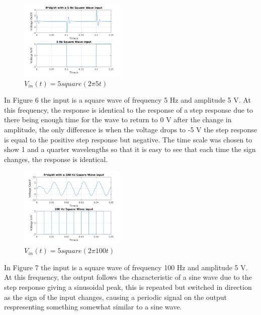 \documentclass[11pt,a4paper]{article}
\begin{document}
\begin{figure}
    \vspace{-40mm}
  		\includegraphics[width=0.45\textwidth]{Ex3_Figs/5Squ1.png}
	\vspace{-6mm}
  	\caption{$V_{in}(t)= 5square(2 \pi 5t)$}
  	\label{fig:ex3g5}
\end{figure}

\vspace{3mm}In Figure 6 the input is a square wave of frequency 5 Hz and amplitude 5 V. At this frequency, the response is identical to the response of a step response due to there being enough time for the wave to return to 0 V after the change in amplitude, the only difference is when the voltage drops to -5 V the step response is equal to the positive step response but negative. The time scale was chosen to show 1 and a quarter wavelengths so that it is easy to see that each time the sign changes, the response is identical.

\begin{figure}
    \vspace{-40mm}
  		\includegraphics[width=0.45\textwidth]{Ex3_Figs/100Squ1.png}
	\vspace{-6mm}
  	\caption{$V_{in}(t)= 5square(2 \pi 100t)$}
  	\label{fig:ex3g6}
\end{figure}

\vspace{5mm}In Figure 7 the input is a square wave of frequency 100 Hz and amplitude 5 V. At this frequency, the output follows the characteristic of a sine wave due to the step response giving a sinusoidal peak, this is repeated but switched in direction as the sign of the input changes, causing a periodic signal on the output respresenting something somewhat similar to a sine wave.
\end{document}
